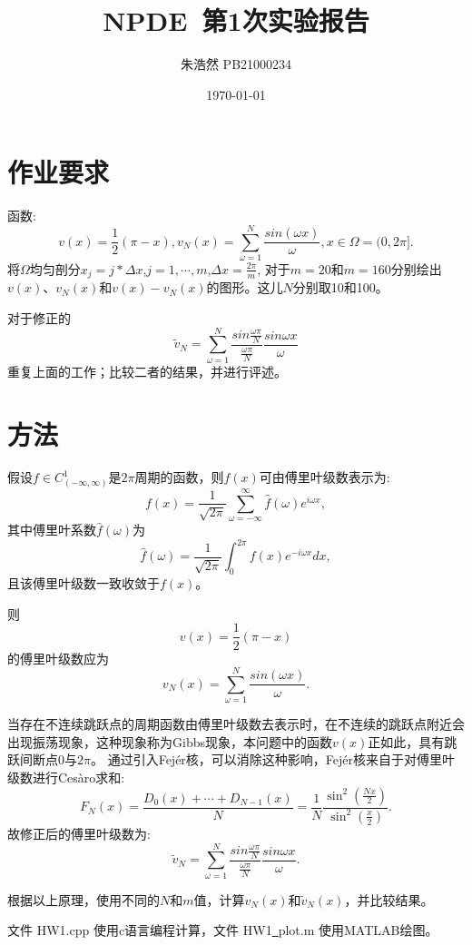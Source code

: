 \documentclass{article}
\title{NPDE~第1次实验报告}
\author{朱浩然 PB21000234}
\date{\today}
\begin{document}
\maketitle

\section{作业要求}

函数:$$v(x) = \frac{1}{2}(\pi - x),v_N(x) = \sum_{\omega=1}^N\frac{sin(\omega x)}{\omega},x \in \Omega = (0,2\pi].$$
将$\Omega$均匀剖分$x_j=j*\Delta x$,$j=1,\cdots,m$,$\Delta x=\frac{2\pi}{m}$, 
对于$m=20$和$m=160$分别绘出$v(x)$、$v_N(x)$和$v(x)-v_N(x)$的图形。这儿$N$分别取10和100。\par 
对于修正的
$$\tilde{v}_N=\sum_{\omega=1}^N\frac{sin\frac{\omega\pi}{N}}{\frac{\omega\pi}{N}}\frac{sin\omega x}{\omega}$$
重复上面的工作；比较二者的结果，并进行评述。

\section{方法}
假设$f \in C_{(-\infty,\infty)}^{1}$是$2\pi$周期的函数，则$f(x)$可由傅里叶级数表示为:
$$f(x)=\frac{1}{\sqrt{2\pi}}\sum_{\omega=-\infty}^{\infty}\hat{f}(\omega)e^{i\omega x},$$
其中傅里叶系数$\hat{f}(\omega)$为$$\hat{f}(\omega)=\frac{1}{\sqrt{2\pi}}\int_{0}^{2\pi}f(x)e^{-i\omega x}dx,$$
且该傅里叶级数一致收敛于$f(x)$。\par
则$$v(x) = \frac{1}{2}(\pi - x)$$的傅里叶级数应为$$v_N(x) = \sum_{\omega=1}^N\frac{sin(\omega x)}{\omega}.$$\par
当存在不连续跳跃点的周期函数由傅里叶级数去表示时，在不连续的跳跃点附近会出现振荡现象，这种现象称为Gibbs现象，本问题中的函数$v(x)$正如此，具有跳跃间断点$0$与$2\pi$。
通过引入Fejér核，可以消除这种影响，Fejér核来自于对傅里叶级数进行Cesàro求和:
$$F_N(x)=\frac{D_0(x)+\cdots+D_{N-1}(x)}N=\frac1N\frac{\sin^2(\frac{Nx}{2})}{\sin^2(\frac{x}{2})}.$$
故修正后的傅里叶级数为:
$$\tilde{v}_N=\sum_{\omega=1}^N\frac{sin\frac{\omega\pi}{N}}{\frac{\omega\pi}{N}}\frac{sin\omega x}{\omega}.$$\par
根据以上原理，使用不同的$N$和$m$值，计算$v_N(x)$和$\tilde{v}_N(x)$，并比较结果。\par
文件 HW1.cpp 使用c语言编程计算，文件 HW1\underline{~}plot.m 使用MATLAB绘图。
\newpage
\end{document}
